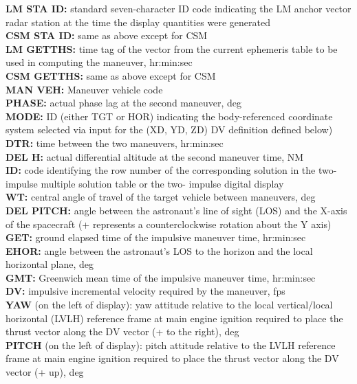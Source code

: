 \documentclass[11pt]{article} %
\begin{document}
\textbf{LM STA ID:} standard seven-character ID code indicating the LM anchor vector radar station at the time the display quantities were generated \\
\textbf{CSM STA ID:} same as above except for CSM\\
\textbf{LM GETTHS:} time tag of the vector from the current ephemeris table to be used in computing the maneuver, hr:min:sec\\
\textbf{CSM GETTHS:} same as above except for CSM\\
\textbf{MAN VEH:} Maneuver vehicle code\\
\textbf{PHASE:} actual phase lag at the second maneuver, deg\\
\textbf{MODE:} ID (either TGT or HOR) indicating the body-referenced coordinate system selected via input for the (XD, YD, ZD) DV definition defined below)\\
\textbf{DTR:} time between the two maneuvers, hr:min:sec\\
\textbf{DEL H:} actual differential altitude at the second maneuver time, NM\\
\textbf{ID:} code identifying the row number of the corresponding solution in the two-impulse multiple solution table or the two- impulse digital display\\
\textbf{WT:} central angle of travel of the target vehicle between maneuvers, deg\\
\textbf{DEL PITCH:} angle between the astronaut's line of sight (LOS) and the X-axis of the spacecraft (+ represents a counterclockwise rotation about the Y axis)\\
\textbf{GET:} ground elapsed time of the impulsive maneuver time, hr:min:sec\\
\textbf{EHOR:} angle between the astronaut's LOS to the horizon and the local horizontal plane, deg\\
\textbf{GMT:} Greenwich mean time of the impulsive maneuver time, hr:min:sec\\
\textbf{DV:} impulsive incremental velocity required by the maneuver, fps\\
\textbf{YAW} (on the left of display): yaw attitude relative to the local vertical/local horizontal (LVLH) reference frame at main engine ignition required to place the thrust vector along the DV vector (+ to the right), deg\\
\textbf{PITCH} (on the left of display): pitch attitude relative to the LVLH reference frame at main engine ignition required to place the thrust vector along the DV vector (+ up), deg\\
\end{document}
